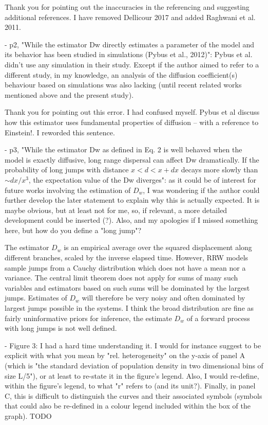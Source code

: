 \documentclass[11pt, oneside]{article}   	%
\newcommand{\response}[1]{{\color{black}{\bf Response:} #1}}
\begin{document}
\response{Thank you for pointing out the inaccuracies in the referencing and suggesting additional references. I have removed Dellicour 2017 and added Raghwani et al. 2011.}


- p2, "While the estimator Dw directly estimates a parameter of the model and its behavior has been studied in simulations (Pybus et al., 2012)": Pybus et al. didn't use any simulation in their study. Except if the author aimed to refer to a different study, in my knowledge, an analysis of the diffusion coefficient(s) behaviour based on simulations was also lacking (until recent related works mentioned above and the present study).

\response{Thank you for pointing out this error. I had confused myself. Pybus et al discuss how this estimator uses fundamental properties of diffusion -- with a reference to Einstein!. I reworded this sentence.}


- p3, "While the estimator Dw as defined in Eq. 2 is well behaved when the model is exactly diffusive, long range dispersal can affect Dw dramatically. If the probability of long jumps with distance $x < d < x+dx$ decays more slowly than $\sim dx/x^3$, the expectation value of the Dw diverges": as it could be of interest for future works involving the estimation of $D_w$, I was wondering if the author could further develop the later statement to explain why this is actually expected. It is maybe obvious, but at least not for me, so, if relevant, a more detailed development could be inserted (?). Also, and my apologies if I missed something here, but how do you define a "long jump"?

\response{
The estimator $D_w$ is an empirical average over the squared displacement along different branches, scaled by the inverse elapsed time.
However, RRW models sample jumps from a Cauchy distribution which does not have a mean nor a variance. The central limit theorem does not apply for sums of many such variables and estimators based on such sums will be dominated by the largest jumps. Estimates of $D_w$ will therefore be very noisy and often dominated by largest jumps possible in the systems.
I think the broad distribution are fine as fairly uninformative priors for inference, the estimate $D_w$ of a forward process with long jumps is not well defined.
}

- Figure 3: I had a hard time understanding it. I would for instance suggest to be explicit with what you mean by "rel. heterogeneity" on the y-axis of panel A (which is "the standard deviation of population density in two dimensional bins of size L/5"), or at least to re-state it in the figure's legend. Also, I would re-define, within the figure's legend, to what "r" refers to (and its unit?). Finally, in panel C, this is difficult to distinguish the curves and their associated symbols (symbols that could also be re-defined in a colour legend included within the box of the graph).
\response{TODO}
\end{document}
